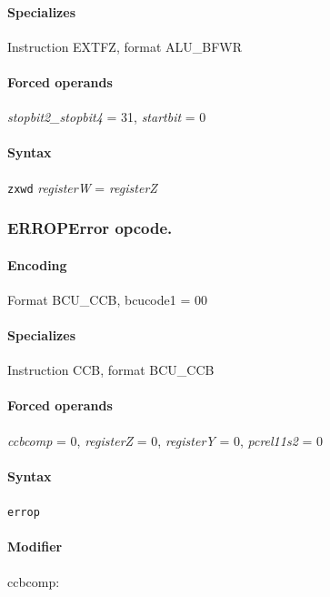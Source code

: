 {


\paragraph{Specializes} Instruction EXTFZ, format ALU\_BFWR

\paragraph{Forced operands} \emph{stopbit2\_stopbit4} = 31, \emph{startbit} = 0

\paragraph{Syntax} \texttt{zxwd} \emph{registerW} = \emph{registerZ}
\newpage
\subsubsection[{\small ERROP: Error opcode.}]{ERROP\hfill Error opcode.}
\label{instr:ERROP}

\paragraph{Encoding} Format \textsf{BCU\_CCB, bcucode1 = 00}\\



\paragraph{Specializes} Instruction CCB, format BCU\_CCB

\paragraph{Forced operands} \emph{ccbcomp} = 0, \emph{registerZ} = 0, \emph{registerY} = 0, \emph{pcrel11s2} = 0

\paragraph{Syntax} \texttt{errop}

\paragraph{Modifier} \textsf{ccbcomp}:\\

}

